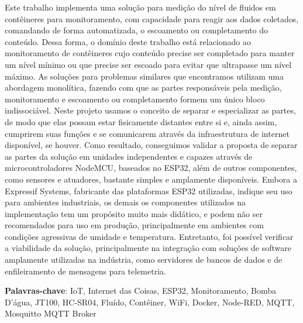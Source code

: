 \newpage
\thispagestyle{empty}
\begin{resumo}
\begin{SingleSpace}
Este trabalho implementa uma solução para medição do nível de fluidos em contêineres para monitoramento, com capacidade para reagir aos dados coletados, comandando de forma automatizada, o escoamento ou completamento do conteúdo. Dessa forma, o domínio deste trabalho está relacionado ao monitoramento de contêineres cujo conteúdo precise ser completado para manter um nível mínimo ou que precise ser escoado para evitar que ultrapasse um nível máximo. As soluções para problemas similares que encontramos utilizam uma abordagem monolítica, fazendo com que as partes responsáveis pela medição, monitoramento e escoamento ou completamento formem um único bloco indissociável. Neste projeto usamos o conceito de separar e especializar as partes, de modo que elas possam estar fisicamente distantes entre si e, ainda assim, cumprirem suas funções e se comunicarem através da infraestrutura de internet disponível, se houver. Como resultado, conseguimos validar a proposta de separar as partes da solução em unidades independentes e capazes através de microcontroladores NodeMCU, baseados no ESP32, além de outros componentes, como sensores e atuadores, bastante simples e amplamente disponíveis. Embora a Expressif Systems, fabricante das plataformas ESP32 utilizadas, indique seu uso para ambientes industriais, os demais os componentes utilizados na implementação tem um propósito muito mais didático, e podem não ser recomendados para uso em produção, principalmente em ambientes com condições agressivas de umidade e temperatura. Entretanto, foi possível verificar a viabilidade da solução, principalmente na integração com soluções de software amplamente utilizadas na indústria, como servidores de bancos de dados e de enfileiramento de mensagens para telemetria.

\end{SingleSpace}
\vspace{\onelineskip}
\textbf{Palavras-chave}: IoT, Internet das Coisas, ESP32, Monitoramento, Bomba D'água, JT100, HC-SR04, Fluído, Contêiner, WiFi, Docker, Node-RED, MQTT, Mosquitto MQTT Broker
\end{resumo}